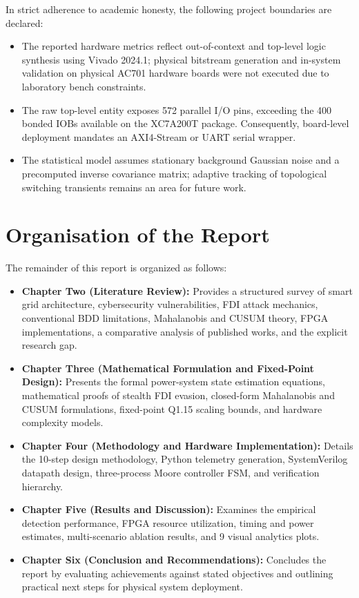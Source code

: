 \documentclass[12pt,a4paper]{report}
\begin{document}
In strict adherence to academic honesty, the following project boundaries are declared:
\begin{itemize}
    \item The reported hardware metrics reflect out-of-context and top-level logic
    synthesis using Vivado 2024.1; physical bitstream generation and in-system
    validation on physical AC701 hardware boards were not executed due to laboratory
    bench constraints.
    \item The raw top-level entity exposes 572 parallel I/O pins, exceeding the 400
    bonded IOBs available on the XC7A200T package. Consequently, board-level deployment
    mandates an AXI4-Stream or UART serial wrapper.
    \item The statistical model assumes stationary background Gaussian noise and a
    precomputed inverse covariance matrix; adaptive tracking of topological switching
    transients remains an area for future work.
\end{itemize}

\section{Organisation of the Report}
The remainder of this report is organized as follows:
\begin{itemize}
    \item \textbf{Chapter Two (Literature Review):} Provides a structured survey of
    smart grid architecture, cybersecurity vulnerabilities, FDI attack mechanics,
    conventional BDD limitations, Mahalanobis and CUSUM theory, FPGA implementations,
    a comparative analysis of published works, and the explicit research gap.
    \item \textbf{Chapter Three (Mathematical Formulation and Fixed-Point Design):}
    Presents the formal power-system state estimation equations, mathematical proofs
    of stealth FDI evasion, closed-form Mahalanobis and CUSUM formulations, fixed-point
    Q1.15 scaling bounds, and hardware complexity models.
    \item \textbf{Chapter Four (Methodology and Hardware Implementation):} Details the
    10-step design methodology, Python telemetry generation, SystemVerilog datapath
    design, three-process Moore controller FSM, and verification hierarchy.
    \item \textbf{Chapter Five (Results and Discussion):} Examines the empirical
    detection performance, FPGA resource utilization, timing and power estimates,
    multi-scenario ablation results, and 9 visual analytics plots.
    \item \textbf{Chapter Six (Conclusion and Recommendations):} Concludes the report
    by evaluating achievements against stated objectives and outlining practical next
    steps for physical system deployment.
\end{itemize}
\end{document}
